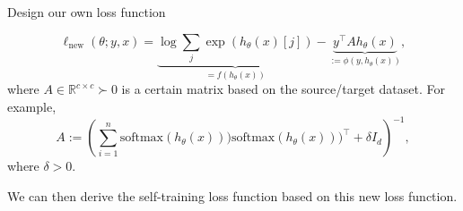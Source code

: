 \documentclass{beamer}
\def\reals{\mathbb{R}}
\begin{document}
\begin{frame}{Design our own loss function}

\begin{equation}
\ell_{\mathrm{new}}(\theta;y,x)  = \underbrace{ \log \sum_j \exp\left( h_{\theta}(x)[j] \right) }_{=f(h_{\theta}(x))} -
\underbrace{ y^\top A h_{\theta}(x) }_{
 := \phi( y, h_{\theta}(x)) },
\end{equation}
where $A \in \reals^{c \times c} \succ 0$ is a certain matrix based on the source/target dataset. For example,
\begin{equation}
A := \left( \sum_{i=1}^n  \mathrm{softmax}(h_{\theta}(x) )) \mathrm{softmax}(h_{\theta}(x) ))^\top
+ \delta I_d \right)^{-1},
\end{equation}
where $\delta>0$.

We can then derive the self-training loss function based on this new loss function.



\end{frame}


\iffalse

\begin{frame}[t]
We get
\begin{block}{}
\begin{equation}
\nabla f(h_{\theta}(x)) = \mathrm{softmax}(h_{\theta}(x) ) = y + \langle \epsilon y , \nabla_h \mathrm{softmax}(h_{\theta}(x) ) \rangle.
\end{equation}
\end{block}
Therefore, 
denote $C :=  \sum_j \exp \left( h_{\theta}(x)[j] \right)$, the $j$-element of the pseudo-label $\hat{y}$ would be
\begin{equation}
\hat{y}[j] = \frac{ \mathrm{softmax}(h_{\theta}(x) ) }{
 1 + \epsilon \left( \underbrace{ \exp \left( h_{\theta}(x)[j] \right) C^{-1} }_{=  \mathrm{softmax}(h_{\theta}(x) )} - \exp \left( h_{\theta}(x)[j] \right)^2 C^{-2}  \right) }.
\end{equation}

You could search for other loss functions, not necessarily limited to Poly-loss.


\end{frame}

\fi
\end{document}
